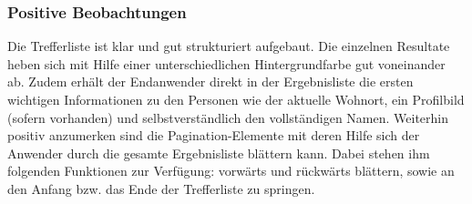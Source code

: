
\subsubsection*{Positive Beobachtungen}
Die Trefferliste ist klar und gut strukturiert aufgebaut. Die einzelnen Resultate heben sich mit Hilfe einer unterschiedlichen Hintergrundfarbe gut voneinander ab. Zudem erhält der Endanwender direkt in der Ergebnisliste die ersten wichtigen Informationen zu den Personen wie der aktuelle Wohnort, ein Profilbild (sofern vorhanden) und selbstverständlich den vollständigen Namen. Weiterhin positiv anzumerken sind die Pagination-Elemente mit deren Hilfe sich der Anwender durch die gesamte Ergebnisliste blättern kann. Dabei stehen ihm folgenden Funktionen zur Verfügung: vorwärts und rückwärts blättern, sowie an den Anfang bzw. das Ende der Trefferliste zu springen. 

